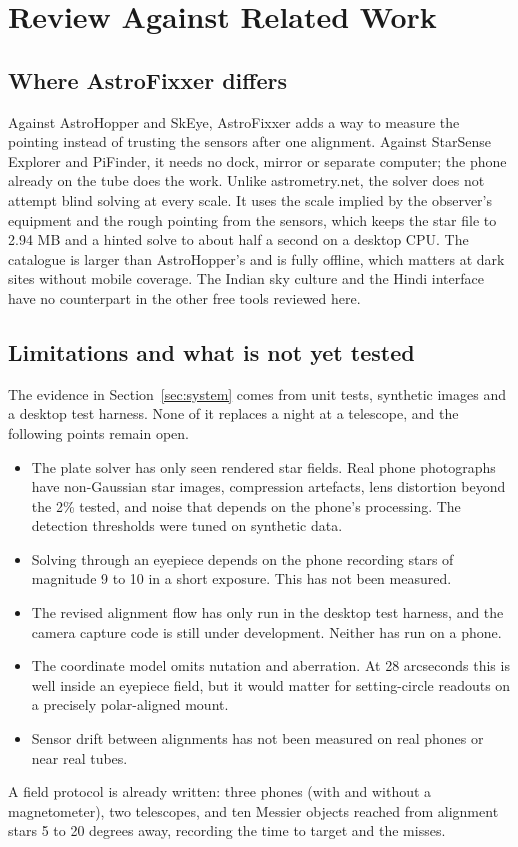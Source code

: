 \section{Review Against Related Work}
\label{sec:review}

\subsection{Where AstroFixxer differs}

Against AstroHopper and SkEye, AstroFixxer adds a way to measure the pointing instead of trusting the sensors after one alignment. Against StarSense Explorer and PiFinder, it needs no dock, mirror or separate computer; the phone already on the tube does the work. Unlike astrometry.net, the solver does not attempt blind solving at every scale. It uses the scale implied by the observer's equipment and the rough pointing from the sensors, which keeps the star file to 2.94 MB and a hinted solve to about half a second on a desktop CPU. The catalogue is larger than AstroHopper's and is fully offline, which matters at dark sites without mobile coverage. The Indian sky culture and the Hindi interface have no counterpart in the other free tools reviewed here.

\subsection{Limitations and what is not yet tested}

The evidence in Section~\ref{sec:system} comes from unit tests, synthetic images and a desktop test harness. None of it replaces a night at a telescope, and the following points remain open.
\begin{itemize}
\item The plate solver has only seen rendered star fields. Real phone photographs have non-Gaussian star images, compression artefacts, lens distortion beyond the 2\% tested, and noise that depends on the phone's processing. The detection thresholds were tuned on synthetic data.
\item Solving through an eyepiece depends on the phone recording stars of magnitude 9 to 10 in a short exposure. This has not been measured.
\item The revised alignment flow has only run in the desktop test harness, and the camera capture code is still under development. Neither has run on a phone.
\item The coordinate model omits nutation and aberration. At 28 arcseconds this is well inside an eyepiece field, but it would matter for setting-circle readouts on a precisely polar-aligned mount.
\item Sensor drift between alignments has not been measured on real phones or near real tubes.
\end{itemize}
A field protocol is already written: three phones (with and without a magnetometer), two telescopes, and ten Messier objects reached from alignment stars 5 to 20 degrees away, recording the time to target and the misses.
